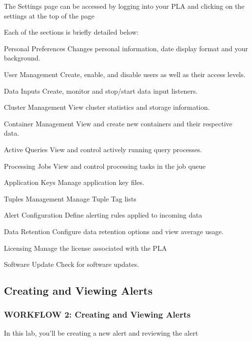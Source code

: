 \documentclass[letterpaper,10pt,english]{sphinxmanual}
\begin{document}
The Settings page can be accessed by logging into your PLA and clicking
on the settings at the top of the page


Each of the sections is briefly detailed below:

Personal Preferences \textendash{} Changes personal information, date display format
and your background.

User Management \textendash{} Create, enable, and disable users as well as their
access levels.

Data Inputs \textendash{} Create, monitor and stop/start data input listeners.

Cluster Management \textendash{} View cluster statistics and storage information.

Container Management \textendash{} View and create new containers and their
respective data.

Active Queries \textendash{} View and control actively running query processes.

Processing Jobs \textendash{} View and control processing tasks in the job queue

Application Keys \textendash{} Manage application key files.

Tuples Management \textendash{} Manage Tuple Tag lists

Alert Configuration \textendash{} Define alerting rules applied to incoming data

Data Retention \textendash{} Configure data retention options and view average
usage.

Licensing \textendash{} Manage the license associated with the PLA

Software Update \textendash{} Check for software updates.


\subsection{Creating and Viewing Alerts}
\label{\detokenize{class1/module6/lab3:creating-and-viewing-alerts}}\label{\detokenize{class1/module6/lab3::doc}}

\subsubsection{WORKFLOW 2: Creating and Viewing Alerts}
\label{\detokenize{class1/module6/lab3:workflow-2-creating-and-viewing-alerts}}
In this lab, you’ll be creating a new alert and reviewing the alert
\end{document}
